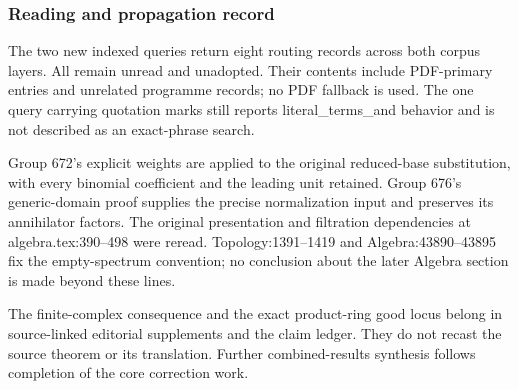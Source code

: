 \subsubsection{Reading and propagation record}\label{algebra-proof-027-reading-and-propagation-record}

The two new indexed queries return eight routing records across both corpus layers. All remain unread and unadopted. Their contents include PDF-primary entries and unrelated programme records; no PDF fallback is used. The one query carrying quotation marks still reports literal\_terms\_and behavior and is not described as an exact-phrase search.

Group 672's explicit weights are applied to the original reduced-base substitution, with every binomial coefficient and the leading unit retained. Group 676's generic-domain proof supplies the precise normalization input and preserves its annihilator factors. The original presentation and filtration dependencies at algebra.\AlgebraIdentifierBreak{}tex:\AlgebraIdentifierBreak{}390--\AlgebraIdentifierBreak{}498 were reread. Topology:1391--1419 and Algebra:43890--43895 fix the empty-spectrum convention; no conclusion about the later Algebra section is made beyond these lines.

The finite-complex consequence and the exact product-ring good locus belong in source-linked editorial supplements and the claim ledger. They do not recast the source theorem or its translation. Further combined-results synthesis follows completion of the core correction work.
